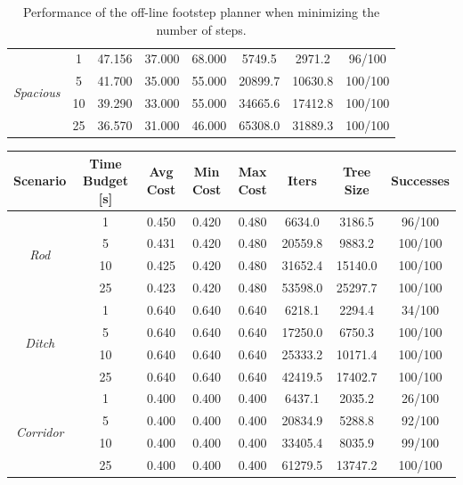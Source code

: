 \begin{table}
\begin{tabular}{*{8}{c}}
        \hline   
        \multirow{4}{*}{\textit{Spacious}} & 1 & 47.156 & 37.000 & 68.000 & 5749.5 & 2971.2 & 96/100 \\
         & 5 & 41.700 & 35.000 & 55.000 & 20899.7 & 10630.8 & 100/100 \\
         & 10 & 39.290 & 33.000 & 55.000 & 34665.6 & 17412.8 & 100/100 \\
         & 25 & 36.570 & 31.000 & 46.000 & 65308.0 & 31889.3 & 100/100 \\   
    
    \end{tabular}
    \caption{Performance of the off-line footstep planner when minimizing the number of steps.}
    \label{tab:benchmark:off-line:steps}
\end{table}

\begin{table}
    \centering
    \scriptsize
    \begin{tabular}{*{8}{c}}
         Scenario & Time Budget [s] & Avg Cost & Min Cost & Max Cost & Iters & Tree Size & Successes \\
        \hline
        \multirow{4}{*}{\textit{Rod}} & 1 & 0.450 & 0.420 & 0.480 & 6634.0 & 3186.5 & 96/100 \\
         & 5 & 0.431 & 0.420 & 0.480 & 20559.8 & 9883.2 & 100/100 \\
         & 10 & 0.425 & 0.420 & 0.480 & 31652.4 & 15140.0 & 100/100 \\
         & 25 & 0.423 & 0.420 & 0.480 & 53598.0 & 25297.7 & 100/100 \\
        
        \hline                                                          
        \multirow{4}{*}{\textit{Ditch}} & 1 & 0.640 & 0.640 & 0.640 & 6218.1 & 2294.4 & 34/100 \\
         & 5 & 0.640 & 0.640 & 0.640 & 17250.0 & 6750.3 & 100/100 \\
         & 10 & 0.640 & 0.640 & 0.640 & 25333.2 & 10171.4 & 100/100 \\
         & 25 & 0.640 & 0.640 & 0.640 & 42419.5 & 17402.7 & 100/100 \\  
        
        \hline                                                            
        \multirow{4}{*}{\textit{Corridor}} & 1 & 0.400 & 0.400 & 0.400 & 6437.1 & 2035.2 & 26/100 \\
         & 5 & 0.400 & 0.400 & 0.400 & 20834.9 & 5288.8 & 92/100 \\
         & 10 & 0.400 & 0.400 & 0.400 & 33405.4 & 8035.9 & 99/100 \\
         & 25 & 0.400 & 0.400 & 0.400 & 61279.5 & 13747.2 & 100/100 \\    


\end{tabular}
\end{table}
